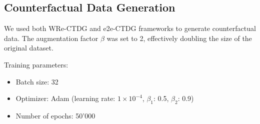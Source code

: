 \subsection{Counterfactual Data Generation}

We used both WRe-CTDG and e2e-CTDG frameworks to generate counterfactual data. The augmentation factor $\beta$ was set to 2, effectively doubling the size of the original dataset.

Training parameters:
\begin{itemize}
    \item Batch size: 32
    \item Optimizer: Adam (learning rate: $1\times 10^{-4}$, $\beta_1$: 0.5, $\beta_2$: 0.9)
    \item Number of epochs: 50'000
\end{itemize}


